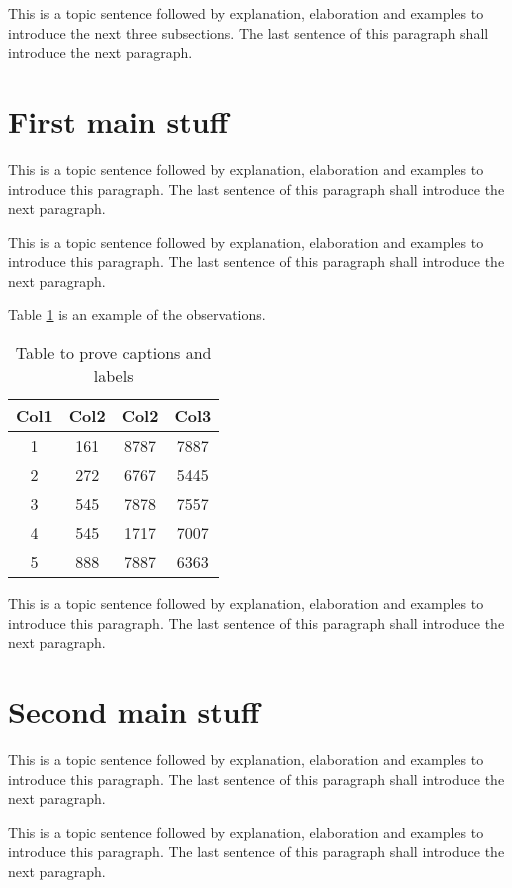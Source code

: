 This is a topic sentence followed by explanation, elaboration and examples to introduce the next three subsections. The last sentence of this paragraph shall introduce the next paragraph. \lipsum[1]

\section{First main stuff}
\label{sec:ch_3_firstmain}

This is a topic sentence followed by explanation, elaboration and examples to introduce this paragraph. The last sentence of this paragraph shall introduce the next paragraph. \lipsum[1]

This is a topic sentence followed by explanation, elaboration and examples to introduce this paragraph. The last sentence of this paragraph shall introduce the next paragraph. \lipsum[1]

Table \ref{table:1} is an example of the observations.

\begin{table}[h!]
\centering
 \begin{tabular}{||c c c c||} 
 \hline
 Col1 & Col2 & Col2 & Col3 \\ [0.5ex] 
 \hline\hline
 1 & 161 & 8787 & 7887 \\ 
 2 & 272 & 6767 & 5445 \\
 3 & 545 & 7878 & 7557 \\
 4 & 545 & 1717 & 7007 \\
 5 & 888 & 7887 & 6363 \\ [1ex] 
 \hline
 \end{tabular}
 \caption{Table to prove captions and labels}
 \label{table:1}
\end{table}

This is a topic sentence followed by explanation, elaboration and examples to introduce this paragraph. The last sentence of this paragraph shall introduce the next paragraph. \lipsum[1]

\section{Second main stuff}
\label{sec:ch_3_secondmain}


This is a topic sentence followed by explanation, elaboration and examples to introduce this paragraph. The last sentence of this paragraph shall introduce the next paragraph. \lipsum[1]

This is a topic sentence followed by explanation, elaboration and examples to introduce this paragraph. The last sentence of this paragraph shall introduce the next paragraph. \lipsum[1]

